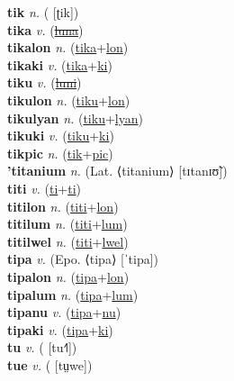 \textbf{tik} \textit{n.} ( [ʈik])
 \label{tik} \\
\textbf{tika} \textit{v.} (\hyperref[luna]{\sout{luna}})
 \label{tika} \\
\textbf{tikalon} \textit{n.} (\hyperref[tika]{tika}+\hyperref[lon]{lon})
 \label{tikalon} \\
\textbf{tikaki} \textit{v.} (\hyperref[tika]{tika}+\hyperref[ki]{ki})
 \label{tikaki} \\
\textbf{tiku} \textit{v.} (\hyperref[luni]{\sout{luni}})
 \label{tiku} \\
\textbf{tikulon} \textit{n.} (\hyperref[tiku]{tiku}+\hyperref[lon]{lon})
 \label{tikulon} \\
\textbf{tikulyan} \textit{n.} (\hyperref[tiku]{tiku}+\hyperref[lyan]{lyan})
 \label{tikulyan} \\
\textbf{tikuki} \textit{v.} (\hyperref[tiku]{tiku}+\hyperref[ki]{ki})
 \label{tikuki} \\
\textbf{tikpic} \textit{n.} (\hyperref[tik]{tik}+\hyperref[pic]{pic})
 \label{tikpic} \\
\textbf{'titanium} \textit{n.} (Lat. ⟨titanium⟩ [tɪtanɪʊ̃])
 \label{'titanium} \\
\textbf{titi} \textit{v.} (\hyperref[ti]{ti}+\hyperref[ti]{ti})
 \label{titi} \\
\textbf{titilon} \textit{n.} (\hyperref[titi]{titi}+\hyperref[lon]{lon})
 \label{titilon} \\
\textbf{titilum} \textit{n.} (\hyperref[titi]{titi}+\hyperref[lum]{lum})
 \label{titilum} \\
\textbf{titilwel} \textit{n.} (\hyperref[titi]{titi}+\hyperref[lwel]{lwel})
 \label{titilwel} \\
\textbf{tipa} \textit{v.} (Epo. ⟨tipa⟩ [ˈtipa])
 \label{tipa} \\
\textbf{tipalon} \textit{n.} (\hyperref[tipa]{tipa}+\hyperref[lon]{lon})
 \label{tipalon} \\
\textbf{tipalum} \textit{n.} (\hyperref[tipa]{tipa}+\hyperref[lum]{lum})
 \label{tipalum} \\
\textbf{tipanu} \textit{v.} (\hyperref[tipa]{tipa}+\hyperref[nu]{nu})
 \label{tipanu} \\
\textbf{tipaki} \textit{v.} (\hyperref[tipa]{tipa}+\hyperref[ki]{ki})
 \label{tipaki} \\
\textbf{tu} \textit{v.} ( [tu˧˥])
 \label{tu} \\
\textbf{tue} \textit{v.} ( [tṳwe])
 \label{tue} \\
